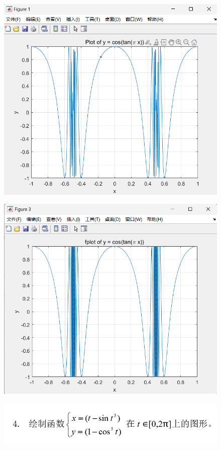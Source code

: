 \documentclass[12pt,UTF8]{ctexart}
\begin{document}
\begin{figure}
    \centering
    \includegraphics[width=0.75\linewidth]{3.2.png}


\end{figure}

\begin{figure}
    \centering
    \includegraphics[width=0.75\linewidth]{3.11.png}
    
    
\end{figure}


\clearpage


\begin{figure}
    \centering
    \includegraphics[width=1\linewidth]{++4.png}
    
    
\end{figure}
\end{document}
